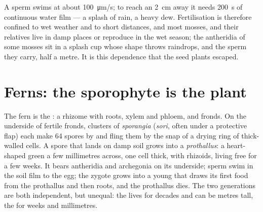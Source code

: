 \begin{example}\label{ex:b2:plant-life-cycles:sperm}
A  sperm swims at about \qty{100}{\micro m/s}; to reach an
 \qty{2}{cm} away it needs \qty{200}{s} of continuous
water film --- a splash of rain, a heavy dew. Fertilisation is
therefore confined to wet weather and to short distances, and most
mosses,  and their relatives live in damp places or reproduce
in the wet season; the antheridia of some mosses sit in a splash cup
whose shape throws raindrops, and the sperm they carry, half a metre.
It is this dependence that the seed plants escaped.
\end{example}

\section{Ferns: the sporophyte is the plant}

\begin{definition}\label{def:b2:plant-life-cycles:fern}
The fern is the \emph{}: a rhizome with roots, xylem and
phloem, and fronds. On the underside of fertile fronds, clusters of
\emph{sporangia} (\emph{sori}, often under a protective flap) each
make 64 spores by  and fling them by the snap of a drying
ring of thick-walled cells. A spore that lands on damp soil grows
into a \emph{prothallus}: a heart-shaped green  a few
millimetres across, one cell thick, with rhizoids, living free for a
few weeks. It bears antheridia and archegonia on its underside; sperm
swim in the soil film to the egg; the zygote grows into a young
 that draws its first food from the prothallus and then
roots, and the prothallus dies. The two generations are both
independent, but unequal: the  lives for decades and can
be metres tall, the  for weeks and millimetres.
\end{definition}

